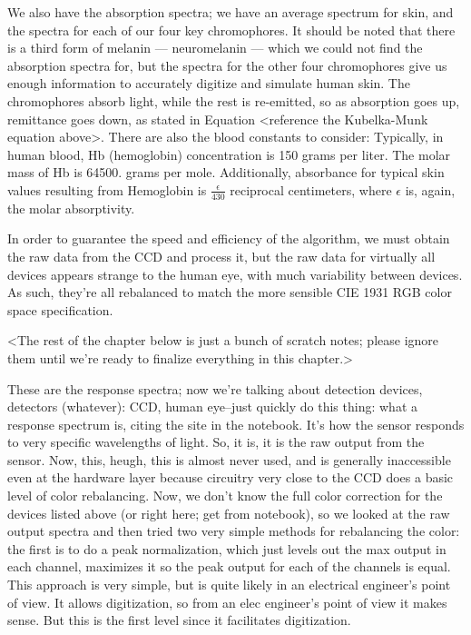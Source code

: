 We also have the absorption spectra; we have an average spectrum for skin, and the spectra for each of our four key chromophores. It should be noted that there is a third form of melanin --- neuromelanin --- which we could not find the absorption spectra for, but the spectra for the other four chromophores give us enough information to accurately digitize and simulate human skin. The chromophores absorb light, while the rest is re-emitted, so as absorption goes up, remittance goes down, as stated in Equation <reference the Kubelka-Munk equation above>. There are also the blood constants to consider: Typically, in human blood, Hb (hemoglobin) concentration is 150 grams per liter. The molar mass of Hb is 64500. grams per mole. Additionally, absorbance for typical skin values resulting from Hemoglobin is $\frac{\epsilon}{430}$ reciprocal centimeters, where $\epsilon$ is, again, the molar absorptivity.

In order to guarantee the speed and efficiency of the algorithm, we must obtain the raw data from the CCD and process it, but the raw data for virtually all devices appears strange to the human eye, with much variability between devices. As such, they're all rebalanced to match the more sensible CIE 1931 RGB color space specification.


<The rest of the chapter below is just a bunch of scratch notes; please ignore them until we're ready to finalize everything in this chapter.>




These are the response spectra; now we're talking about detection devices, detectors (whatever): CCD, human eye--just quickly do this thing: what a response spectrum is, citing the site in the notebook. It's how the sensor responds to very specific wavelengths of light. So, it is, it is the raw output from the sensor. Now, this, heugh, this is almost never used, and is generally inaccessible even at the hardware layer because circuitry very close to the CCD does a basic level of color rebalancing. Now, we don't know the full color correction for the devices listed above (or right here; get from notebook), so we looked at the raw output spectra and then tried two very simple methods for rebalancing the color: the first is to do a peak normalization, which just levels out the max output in each channel, maximizes it so the peak output for each of the channels is equal. This approach is very simple, but is quite likely in an electrical engineer's point of view. It allows digitization, so from an elec engineer's point of view it makes sense. But this is the first level since it facilitates digitization. 

